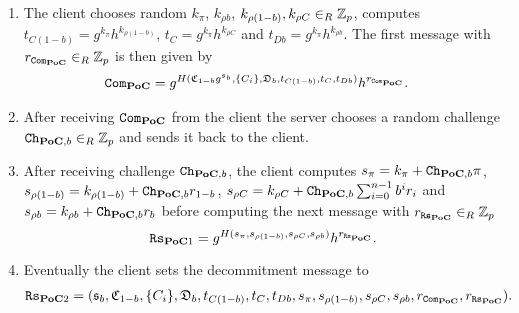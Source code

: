 \begin{enumerate}
  \item %
    The client chooses random $k_{\pi}$, $k_{\rho b}$, $k_{\rho (1-b)}, k_{\rho C}\in_R\mathbb{Z}_p$, computes $t_{C(1-b)}=g^{k_{\pi}}h^{k_{\rho (1-b)}}$, $t_{C}=g^{k_\pi}h^{k_{\rho C}}$ and $t_{Db}=g^{k_{\pi}}h^{k_{\rho b}}$.
    The first message with $r_{\mathtt{Com}_{\mathsf{\bf PoC}}}\in_R\mathbb{Z}_p$ is then given by
    \begin{align*}      
    & \mathtt{Com}_{\mathsf{\bf PoC}}=g^{H(\mathfrak{C}_{1-b}g^{\mathfrak{s}_b}, \{C_i\}, \mathfrak{D}_b, t_{C(1-b)}, t_C, t_{Db})} h^{r_{\mathtt{Com}_{\mathsf{\bf PoC}}}}.
    \end{align*}

  \item %
    After receiving $\mathtt{Com}_{\mathsf{\bf PoC}}$ from the client the server chooses a random challenge $\mathtt{Ch}_{\mathsf{\bf PoC},b}\in_R\mathbb{Z}_p$ and sends it back to the client.

  \item %
    After receiving challenge $\mathtt{Ch}_{\mathsf{\bf PoC}, b}$, the client computes $s_{\pi}=k_{\pi}+\mathtt{Ch}_{\mathsf{\bf PoC},b}\pi$, $s_{\rho (1-b)}=k_{\rho{(1-b)}}+\mathtt{Ch}_{\mathsf{\bf PoC},b}r_{1-b}$, $s_{\rho C}=k_{\rho C} + \mathtt{Ch}_{\mathsf{\bf PoC},b} \sum_{i=0}^{n-1}b^i r_i$ and $s_{\rho b}=k_{\rho{b}}+\mathtt{Ch}_{\mathsf{\bf PoC},b}r_{b}$ before computing the next message with $r_{\mathtt{Rs}_{\mathsf{\bf PoC}}}\in_R\mathbb{Z}_p$
    \[\mathtt{Rs}_{\mathsf{\bf PoC}1}=g^{H(s_{\pi}, s_{\rho (1-b)}, s_{\rho C}, s_{\rho b})} h^{r_{\mathtt{Rs}_{\mathsf{\bf PoC}}}}.\]

  \item %
    Eventually the client sets the decommitment message to
    \begin{align*}
    & \mathtt{Rs}_{\mathsf{\bf PoC}2}=(\mathfrak{s}_b, \mathfrak{C}_{1-b}, \{C_i\}, \mathfrak{D}_b, t_{C(1-b)}, t_C, t_{Db}, s_{\pi}, s_{\rho (1-b)}, s_{\rho C}, s_{\rho b}, r_{\mathtt{Com}_{\mathsf{\bf PoC}}}, r_{\mathtt{Rs}_{\mathsf{\bf PoC}}}).
    \end{align*}
\end{enumerate}

